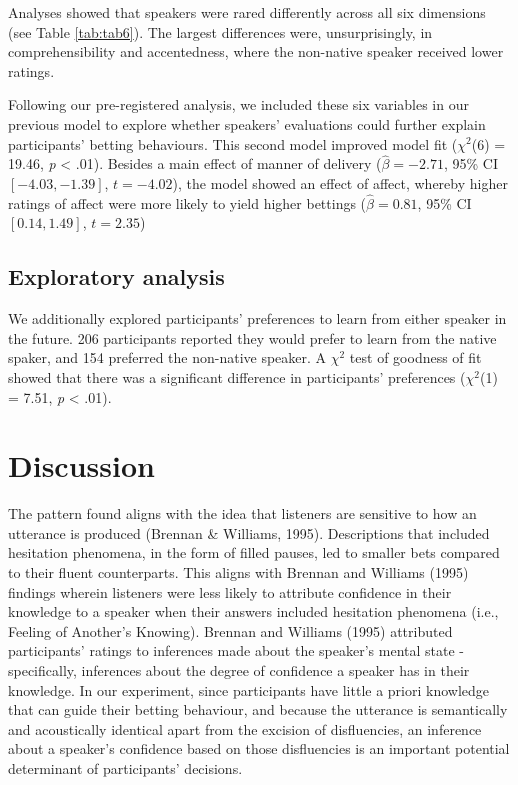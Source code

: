 \documentclass[
  man,floatsintext]{apa6}
\begin{document}
Analyses showed that speakers were rared differently across all six dimensions (see Table \ref{tab:tab6}). The largest differences were, unsurprisingly, in comprehensibility and accentedness, where the non-native speaker received lower ratings.

Following our pre-registered analysis, we included these six variables in our previous model to explore whether speakers' evaluations could further explain participants' betting behaviours. This second model improved model fit (\(\chi^2\)(6) = 19.46, \emph{p} \textless{} .01). Besides a main effect of manner of delivery (\(\hat{\beta} = -2.71\), 95\% CI \([-4.03, -1.39]\), \(t = -4.02\)), the model showed an effect of affect, whereby higher ratings of affect were more likely to yield higher bettings (\(\hat{\beta} = 0.81\), 95\% CI \([0.14, 1.49]\), \(t = 2.35\))

\hypertarget{exploratory-analysis}{%
\subsection{Exploratory analysis}\label{exploratory-analysis}}

We additionally explored participants' preferences to learn from either speaker in the future. 206 participants reported they would prefer to learn from the native spaker, and 154 preferred the non-native speaker. A \(\chi^2\) test of goodness of fit showed that there was a significant difference in participants' preferences (\(\chi^2\)(1) = 7.51, \emph{p} \textless{} .01).

\hypertarget{discussion}{%
\section{Discussion}\label{discussion}}

The pattern found aligns with the idea that listeners are sensitive to how an utterance is produced (Brennan \& Williams, 1995). Descriptions that included hesitation phenomena, in the form of filled pauses, led to smaller bets compared to their fluent counterparts. This aligns with Brennan and Williams (1995) findings wherein listeners were less likely to attribute confidence in their knowledge to a speaker when their answers included hesitation phenomena (i.e., Feeling of Another's Knowing). Brennan and Williams (1995) attributed participants' ratings to inferences made about the speaker's mental state - specifically, inferences about the degree of confidence a speaker has in their knowledge. In our experiment, since participants have little a priori knowledge that can guide their betting behaviour, and because the utterance is semantically and acoustically identical apart from the excision of disfluencies, an inference about a speaker's confidence based on those disfluencies is an important potential determinant of participants' decisions.
\end{document}
